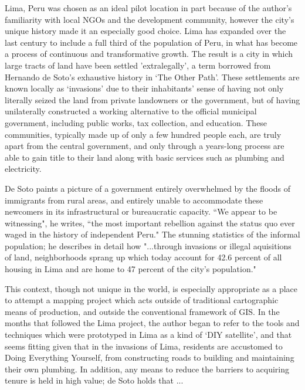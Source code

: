 \documentclass[11pt]{report}
\begin{document}
Lima, Peru was chosen as an ideal pilot location in part because of the author's familiarity with local NGOs and the development community, however the city's unique history made it an especially good choice. Lima has expanded over the last century to include a full third of the population of Peru, in what has become a process of continuous and transformative growth. The result is a city in which large tracts of land have been settled 'extralegally', a term borrowed from Hernando de Soto's exhaustive history in `The Other Path'. These settlements are known locally as `invasions' due to their inhabitants' sense of having not only literally seized the land from private landowners or the government, but of having unilaterally constructed a working alternative to the official municipal government, including public works, tax collection, and education. These communities, typically made up of only a few hundred people each, are truly apart from the central government, and only through a years-long process are able to gain title to their land along with basic services such as plumbing and electricity.

De Soto paints a picture of a government entirely overwhelmed by the floods of immigrants from rural areas, and entirely unable to accommodate these newcomers in its infrastructural or bureaucratic capacity. ``We appear to be witnessing", he writes, ``the most important rebellion against the status quo ever waged in the history of independent Peru." The stunning statistics of the informal population; he describes in detail how "...through invasions or illegal aquisitions of land, neighborhoods sprang up which today account for 42.6 percent of all housing in Lima and are home to 47 percent of the city's population." \cite{desoto1987sendero}

This context, though not unique in the world, is especially appropriate as a place to attempt a mapping project which acts outside of traditional cartographic means of production, and outside the conventional framework of GIS. In the months that followed the Lima project, the author began to refer to the tools and techniques which were prototyped in Lima as a kind of `DIY satellite', and that seems fitting given that in the invasions of Lima, residents are accustomed to Doing Everything Yourself, from constructing roads to building and maintaining their own plumbing. In addition, any means to reduce the barriers to acquiring tenure is held in high value; de Soto holds that ...
\end{document}
